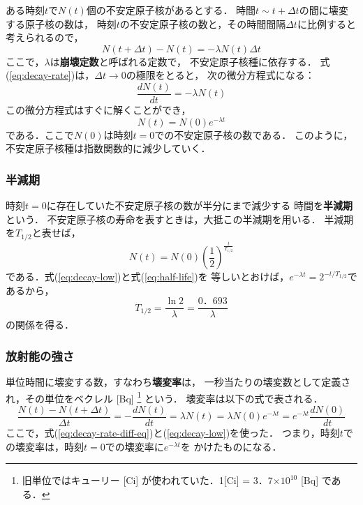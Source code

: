 \documentclass[a4j,10pt,oneside,openany]{jsbook}
\begin{document}
ある時刻$t$で$N(t)$個の不安定原子核があるとする．
時間$t\sim t+\Delta t$の間に壊変する原子核の数は，
時刻$t$の不安定原子核の数と，その時間間隔$\Delta t$に比例すると考えられるので，
\begin{equation}
  N(t+\Delta t) - N(t) = -\lambda N(t)\Delta t
  \label{eq:decay-rate}
\end{equation}
ここで，$\lambda$は{\bf 崩壊定数}と呼ばれる定数で，
不安定原子核種に依存する．
式(\ref{eq:decay-rate})は，$\Delta t \to 0$の極限をとると，
次の微分方程式になる：
\begin{equation}
  \frac{dN(t)}{dt} = -\lambda N(t)
  \label{eq:decay-rate-diff-eq}
\end{equation}
この微分方程式はすぐに解くことができ，
\begin{equation}
  N(t) = N(0)e^{-\lambda t}
  \label{eq:decay-low}
\end{equation}
である．ここで$N(0)$は時刻$t=0$での不安定原子核の数である．
このように，不安定原子核種は指数関数的に減少していく．

\subsubsection{半減期}

時刻$t=0$に存在していた不安定原子核の数が半分にまで減少する
時間を{\bf 半減期}という．
不安定原子核の寿命を表すときは，大抵この半減期を用いる．
半減期を$T_{1/2}$と表せば，
\begin{equation}
  N(t) = N(0)\left(\frac{1}{2}\right)^{\frac{t}{T_{1/2}}}
  \label{eq:half-life}
\end{equation}
である．式(\ref{eq:decay-low})と式(\ref{eq:half-life})を
等しいとおけば，$e^{-\lambda t} = 2^{-t/T_{1/2}}$であるから，
\begin{equation}
  T_{1/2} = \frac{\ln 2}{\lambda} = \frac{0．693}{\lambda}
\end{equation}
の関係を得る．

\subsubsection{放射能の強さ}

単位時間に壊変する数，すなわち{\bf 壊変率}は，
一秒当たりの壊変数として定義され，その単位をベクレル [Bq] \footnote{
旧単位ではキューリー [Ci] が使われていた．1[Ci] = 3．7$\times 10^{10}$ [Bq]
である．}
という．
壊変率は以下の式で表される．
\begin{equation}
  \frac{N(t)-N(t+\Delta t)}{\Delta t} = -\frac{dN(t)}{dt}
  =\lambda N(t) = \lambda N(0)e^{-\lambda t}
  =e^{-\lambda t}\frac{dN(0)}{dt}
\end{equation}
ここで，式(\ref{eq:decay-rate-diff-eq})と(\ref{eq:decay-low})を使った．
つまり，時刻$t$での壊変率は，時刻$t=0$での壊変率に$e^{-\lambda t}$を
かけたものになる．
\end{document}
